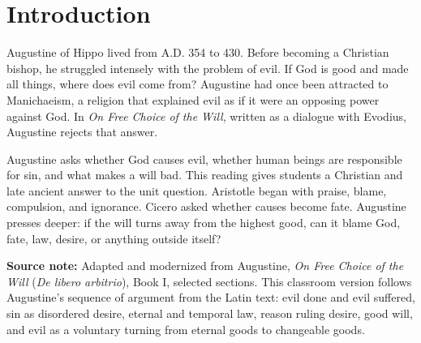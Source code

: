\documentclass[12pt]{article}
\newcommand{\focusbox}[1]{%
\vspace{0.4em}\noindent\colorbox{gray!12}{\begin{minipage}{0.96\linewidth}#1\end{minipage}}\vspace{0.5em}}
\begin{document}
\section*{Introduction}
Augustine of Hippo lived from A.D. 354 to 430. Before becoming a Christian bishop, he struggled intensely with the problem of evil. If God is good and made all things, where does evil come from? Augustine had once been attracted to Manichaeism, a religion that explained evil as if it were an opposing power against God. In \textit{On Free Choice of the Will}, written as a dialogue with Evodius, Augustine rejects that answer.

Augustine asks whether God causes evil, whether human beings are responsible for sin, and what makes a will bad. This reading gives students a Christian and late ancient answer to the unit question. Aristotle began with praise, blame, compulsion, and ignorance. Cicero asked whether causes become fate. Augustine presses deeper: if the will turns away from the highest good, can it blame God, fate, law, desire, or anything outside itself?

\focusbox{\textbf{Source note:} Adapted and modernized from Augustine, \textit{On Free Choice of the Will} (\textit{De libero arbitrio}), Book I, selected sections. This classroom version follows Augustine's sequence of argument from the Latin text: evil done and evil suffered, sin as disordered desire, eternal and temporal law, reason ruling desire, good will, and evil as a voluntary turning from eternal goods to changeable goods.}
\end{document}
